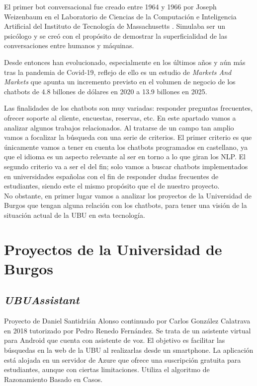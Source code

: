 
El primer bot conversacional fue creado entre 1964 y 1966 por Joseph Weizenbaum en el Laboratorio de Ciencias de la Computación e Inteligencia Artificial del Instituto de Tecnología de Massachusetts \cite{wiki:eliza}. Simulaba ser un psicólogo y se creó con el propósito de demostrar la superficialidad de las conversaciones entre humanos y máquinas.

Desde entonces han evolucionado, especialmente en los últimos años y aún más tras la pandemia de Covid-19, reflejo de ello es un estudio de \textit{Markets And Markets} \cite{ChatbotGrowth} que apunta un incremento previsto en el volumen de negocio de los chatbots de 4.8 billones de dólares en 2020 a 13.9 billones en 2025.

Las finalidades de los chatbots son muy variadas: responder preguntas frecuentes, ofrecer soporte al cliente, encuestas, reservas, etc. En este apartado vamos a analizar algunos trabajos relacionados. Al tratarse de un campo tan amplio vamos a focalizar la búsqueda con una serie de criterios. El primer criterio es que únicamente vamos a tener en cuenta los chatbots programados en castellano, ya que el idioma es un aspecto relevante al ser en torno a lo que giran los NLP.
El segundo criterio va a ser el del fin; solo vamos a buscar chatbots implementados en universidades españolas con el fin de responder dudas frecuentes de estudiantes, siendo este el mismo propósito que el de nuestro proyecto.
\\No obstante, en primer lugar vamos a analizar los proyectos de la Universidad de Burgos que tengan alguna relación con los chatbots, para tener una visión de la situación actual de la UBU en esta tecnología.

\newpage


\section{Proyectos de la Universidad de Burgos}

\subsection{\emph{UBUAssistant}}


Proyecto de Daniel Santidrián Alonso continuado por Carlos González Calatrava en 2018 tutorizado por Pedro Renedo Fernández.
Se trata de un asistente virtual para Android que cuenta con asistente de voz. El objetivo es facilitar las búsquedas en la web de la UBU al realizarlas desde un smartphone.
La aplicación está alojada en un servidor de Azure que ofrece una suscripción gratuita para estudiantes, aunque con ciertas limitaciones. Utiliza el algoritmo de Razonamiento Basado en Casos. \cite{UBUAssistant}


